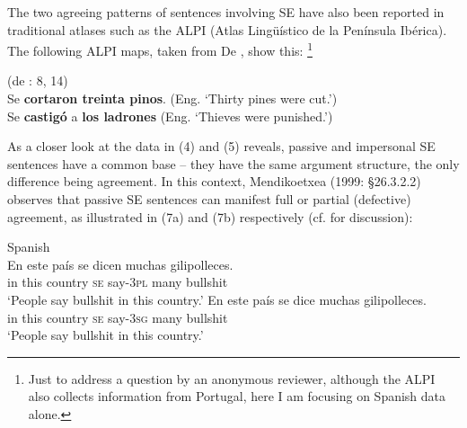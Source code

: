 \documentclass[output=paper]{langsci/langscibook}
\begin{document}
The two agreeing patterns of sentences involving SE have also been reported in traditional atlases such as the ALPI (Atlas Lingüístico de la Península Ibérica). The following ALPI maps, taken from De \citet{Benito2010}, show this: \footnote{Just to address a question by an anonymous reviewer, although the ALPI also collects information from Portugal, here I am focusing on Spanish data alone.} 

\ea%
    (de \citealt{Benito2010}: 8, 14)
    \label{ex:key:6}\\
    \ea Se \textbf{cortaron treinta pinos}. (Eng. ‘Thirty pines were cut.’)\\
    \ex Se \textbf{castigó} a \textbf{los ladrones} (Eng. ‘Thieves were punished.’)\\
    \z
\z

As a closer look at the data in (4) and (5) reveals, passive and impersonal SE sentences have a common base – they have the same argument structure, the only difference being agreement. In this context, Mendikoetxea (1999: §26.3.2.2) observes that passive SE sentences can manifest full or partial (defective) agreement, as illustrated in (7a) and (7b) respectively (cf. \citealt{Zorraquino1979} for discussion):

\ea%
    Spanish\label{ex:key:7}\\
    \ea
    \gll En  este  país        se   dicen       muchas  gilipolleces.       \\
         in   this   country  \textsc{se}  say\textsc{{}-3pl}  many     bullshit\\
    \glt ‘People say bullshit in this country.’
    \ex
    \gll En  este  país        se   dice        muchas  gilipolleces.       \\
         in   this   country  \textsc{se} say\textsc{{}-3sg}  many     bullshit \\
    \glt ‘People say bullshit in this country.’
    \z
\z
\end{document}
